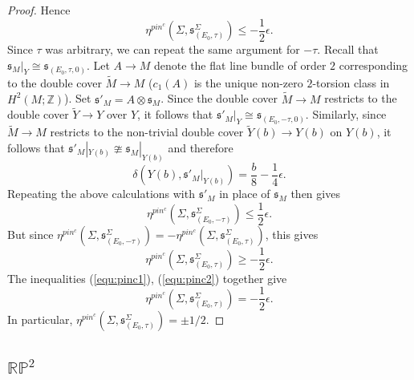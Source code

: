 \documentclass{amsart}
\theoremstyle{definition}
\theoremstyle{remark}
\numberwithin{equation}{section}
\begin{document}
\begin{proof}
Hence
\begin{equation}\label{equ:pinc1}
\eta^{pin^c}(\Sigma , \mathfrak{s}_{(E_0 , \tau)}^\Sigma) \le -\frac{1}{2}\epsilon.
\end{equation}
Since $\tau$ was arbitrary, we can repeat the same argument for $-\tau$. Recall that $\mathfrak{s}_M|_Y \cong \mathfrak{s}_{(E_0 , \tau , 0)}$. Let $A \to M$ denote the flat line bundle of order $2$ corresponding to the double cover $\widetilde{M} \to M$ ($c_1(A)$ is the unique non-zero $2$-torsion class in $H^2(M ; \mathbb{Z})$). Set $\mathfrak{s}'_{M} = A \otimes \mathfrak{s}_M$. Since the double cover $\widetilde{M} \to M$ restricts to the double cover $\widetilde{Y} \to Y$ over $Y$, it follows that $\mathfrak{s}'_{M}|_{Y} \cong \mathfrak{s}_{(E_0 , -\tau , 0)}$. Similarly, since $\widetilde{M} \to M$ restricts to the non-trivial double cover $\widetilde{Y}(b) \to Y(b)$ on $Y(b)$, it follows that $\mathfrak{s}'_M|_{Y(b)} \ncong \mathfrak{s}_M|_{Y(b)}$ and therefore
\[
\delta( Y(b) , \mathfrak{s}'_M|_{Y(b)}) = \frac{b}{8} - \frac{1}{4}\epsilon.
\]
Repeating the above calculations with $\mathfrak{s}'_M$ in place of $\mathfrak{s}_M$ then gives
\[
\eta^{pin^c}(\Sigma , \mathfrak{s}_{(E_0 , -\tau)}^\Sigma) \le \frac{1}{2}\epsilon.
\]
But since $\eta^{pin^c}(\Sigma , \mathfrak{s}_{(E_0 , -\tau)}^\Sigma) = -\eta^{pin^c}(\Sigma , \mathfrak{s}_{(E_0 , \tau)}^\Sigma)$, this gives
\begin{equation}\label{equ:pinc2}
\eta^{pin^c}(\Sigma , \mathfrak{s}_{(E_0 , \tau)}^\Sigma) \ge -\frac{1}{2}\epsilon.
\end{equation}
The inequalities (\ref{equ:pinc1}), (\ref{equ:pinc2}) together give
\[
\eta^{pin^c}(\Sigma , \mathfrak{s}_{(E_0 , \tau)}^\Sigma) = -\frac{1}{2}\epsilon.
\]
In particular, $\eta^{pin^c}(\Sigma , \mathfrak{s}_{(E_0 , \tau)}^\Sigma) = \pm 1/2$.

\end{proof}






\subsection{$\mathbb{RP}^2$}\label{sec:rp2}
\end{document}
